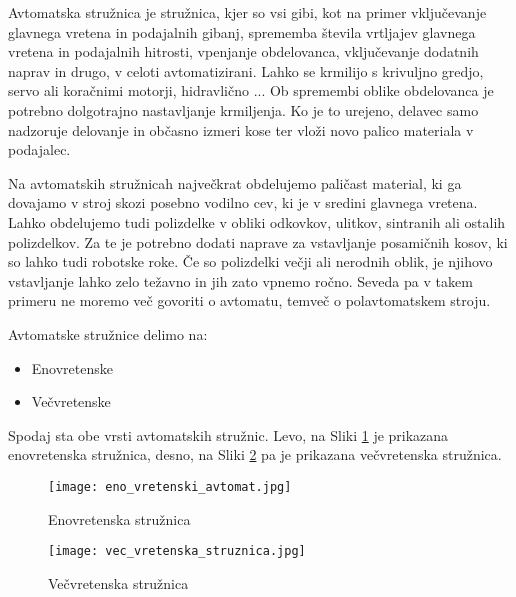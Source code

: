 Avtomatska stružnica je stružnica, kjer so vsi
gibi, kot na primer vključevanje glavnega vretena
in podajalnih gibanj, sprememba števila vrtljajev
glavnega vretena in podajalnih hitrosti, vpenjanje
obdelovanca, vključevanje dodatnih naprav in drugo,
v celoti avtomatizirani. Lahko se krmilijo s krivuljno gredjo,
servo ali koračnimi motorji, hidravlično ... Ob spremembi oblike
obdelovanca je potrebno dolgotrajno nastavljanje krmiljenja.
Ko je to urejeno, delavec samo nadzoruje delovanje
in občasno izmeri kose ter vloži novo palico materiala
v podajalec.

Na avtomatskih stružnicah največkrat obdelujemo paličast
material, ki ga dovajamo v stroj skozi posebno vodilno
cev, ki je v sredini glavnega vretena. Lahko obdelujemo tudi
polizdelke v obliki odkovkov, ulitkov, sintranih ali ostalih polizdelkov.
Za te je potrebno dodati naprave za vstavljanje posamičnih kosov,
ki so lahko tudi robotske roke.
Če so polizdelki večji ali
nerodnih oblik, je njihovo vstavljanje lahko zelo težavno
in jih zato vpnemo ročno. Seveda pa v takem primeru
ne moremo več govoriti o avtomatu, temveč o
polavtomatskem stroju.

\noindent Avtomatske stružnice delimo na:
\begin{itemize}
	\item Enovretenske
	\item Večvretenske
\end{itemize}

Spodaj sta obe vrsti avtomatskih stružnic. Levo, na Sliki \ref{eno_vretenska_struznica}
je prikazana enovretenska stružnica, desno, na Sliki \ref{vec_vretenska_struznica}
pa je prikazana večvretenska stružnica.

\begin{figure}[H]
	\begin{center}
		\texttt{[image: eno\_vretenski\_avtomat.jpg]}
		\caption{Enovretenska stružnica
			\cite{eno_vretenska_struznica}}
		\label{eno_vretenska_struznica}
	\end{center}
\end{figure}

\begin{figure}[H]
	\begin{center}
		\texttt{[image: vec\_vretenska\_struznica.jpg]}
		\caption{Večvretenska stružnica
			\cite{vec_vretenska_struznica}}
		\label{vec_vretenska_struznica}
	\end{center}
\end{figure}
